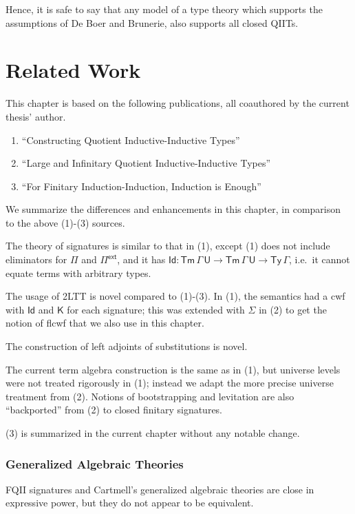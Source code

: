 \documentclass[12pt,a4paper,twoside,openany]{book}
\theoremstyle{remark}
\theoremstyle{definition}
\theoremstyle{theorem}
\newcommand{\Tm}{\mathsf{Tm}}
\newcommand{\Ty}{\mathsf{Ty}}
\newcommand{\U}{\mathsf{U}}
\newcommand{\Id}{\mathsf{Id}}
\newcommand{\Pie}{\Pi^{\mathsf{ext}}}
\newcommand{\K}{\mathsf{K}}
\begin{document}
Hence, it is safe to say that any model of a type theory which supports the
assumptions of De Boer and Brunerie, also supports all closed QIITs.

\section{Related Work}
\label{sec:fqii-related-work}

This chapter is based on the following publications, all coauthored by the
current thesis' author.
\begin{enumerate}
  \item ``Constructing Quotient Inductive-Inductive Types'' \cite{kaposi2019constructing}
  \item ``Large and Infinitary Quotient Inductive-Inductive Types'' \cite{iqiit}
  \item ``For Finitary Induction-Induction, Induction is Enough'' \cite{ind-ind-reduction}
\end{enumerate}
We summarize the differences and enhancements in this chapter, in comparison to the above
(1)-(3) sources.

The theory of signatures is similar to that in (1), except (1) does not include
eliminators for $\Pi$ and $\Pie$, and it has $\Id : \Tm\,\Gamma\,\U \to
\Tm\,\Gamma\,\U \to \Ty\,\Gamma$, i.e.\ it cannot equate terms with arbitrary
types.

The usage of 2LTT is novel compared to (1)-(3). In (1), the semantics had a cwf
with $\Id$ and $\K$ for each signature; this was extended with $\Sigma$ in (2)
to get the notion of flcwf that we also use in this chapter.

The construction of left adjoints of substitutions is novel.

The current term algebra construction is the same as in (1), but universe levels
were not treated rigorously in (1); instead we adapt the more precise universe
treatment from (2). Notions of bootstrapping and levitation are also
``backported'' from (2) to closed finitary signatures.

(3) is summarized in the current chapter without any notable change.

\subsubsection{Generalized Algebraic Theories}

FQII signatures and Cartmell's generalized algebraic theories \cite{gat} are
close in expressive power, but they do not appear to be equivalent.
\end{document}
